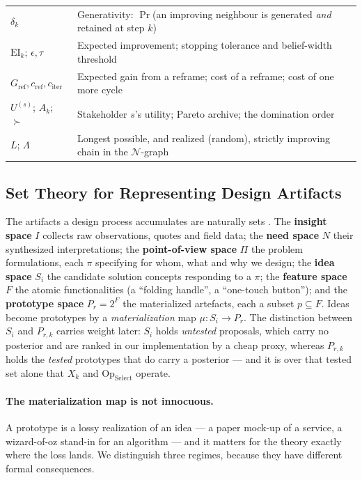\documentclass[11pt]{article}
\newcommand{\Op}[1]{\mathrm{Op}_{\mathrm{#1}}}
\begin{document}
\begin{table}[h!]
\begin{tabularx}{\textwidth}{@{}>{\raggedright\arraybackslash}p{} >{\raggedright\arraybackslash}X@{}}
$\delta_k$ & Generativity: $\Pr$(an improving neighbour is generated \emph{and} retained at step $k$) \\
$\mathrm{EI}_k$; $\epsilon,\tau$ & Expected improvement; stopping tolerance and belief-width threshold \\
$G_{\text{ref}},c_{\text{ref}},c_{\text{iter}}$ & Expected gain from a reframe; cost of a reframe; cost of one more cycle \\
$U^{(s)}$; $A_k$; $\succ$ & Stakeholder $s$'s utility; Pareto archive; the domination order \\
$L$; $\Lambda$ & Longest possible, and realized (random), strictly improving chain in the $\mathcal{N}$-graph \\
\bottomrule
\end{tabularx}
\end{table}

\subsection{Set Theory for Representing Design Artifacts}

The artifacts a design process accumulates are naturally sets \citep{bagaria2021, wikipediaNDa}.
The \textbf{insight space} $I$ collects raw observations, quotes and field data; the \textbf{need space} $N$ their synthesized interpretations; the \textbf{point-of-view space} $\Pi$ the problem formulations, each $\pi$ specifying for whom, what and why we design; the \textbf{idea space} $S_i$ the candidate solution concepts responding to a $\pi$; the \textbf{feature space} $F$ the atomic functionalities (a ``folding handle'', a ``one-touch button''); and the \textbf{prototype space} $P_r=2^F$ the materialized artefacts, each a subset $p\subseteq F$. Ideas become prototypes by a \emph{materialization} map $\mu:S_i\to P_r$. The distinction between $S_i$ and $P_{r,k}$ carries weight later: $S_i$ holds \emph{untested} proposals, which carry no posterior and are ranked in our implementation by a cheap proxy, whereas $P_{r,k}$ holds the \emph{tested} prototypes that do carry a posterior --- and it is over that tested set alone that $X_k$ and $\Op{Select}$ operate.

\paragraph{The materialization map is not innocuous.}
\label{sec:materialization}
A prototype is a lossy realization of an idea --- a paper mock-up of a service, a wizard-of-oz stand-in for an algorithm --- and it matters for the theory exactly where the loss lands. We distinguish three regimes, because they have different formal consequences.
\end{document}
